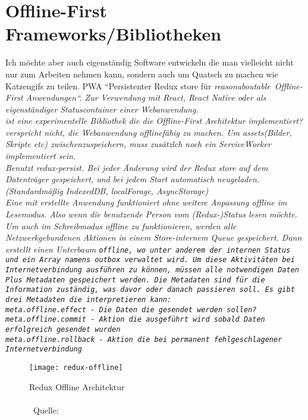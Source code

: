 \section{\label{sec:frameworks}Offline-First Frameworks/Bibliotheken}
  Ich möchte aber auch eigenständig Software entwickeln die man vielleicht nicht nur zum Arbeiten nehmen kann, sondern auch um Quatsch zu machen wie Katzengifs zu teilen.
  \Gls{PWA}
  \cite{realm}
  ``Persistenter Redux store für \it{reasonaboutable}\texttrademark ~Offline-First Anwendungen``. Zur Verwendung mit React, React Native oder als eigenständiger Statuscontainer einer Webanwendung.\\
  ist eine experimentelle Bibliothek die die Offline-First Architektur implementiert?\\
   verspricht nicht, die Webanwendung offlinefähig zu machen. Um \it{assets}(Bilder, Skripte etc) zwischenzuspeichern, muss zusätzlch noch ein ServiceWorker implementiert sein.\\
  Benutzt redux-persist. Bei jeder Änderung wird der Redux store auf dem Datenträger gespeichert, und bei jedem Start automatisch neugeladen. (Standardmäßig IndexedDB, localForage, AsyncStorage)\\
  Eine mit  erstellte Anwendung funktioniert ohne weitere Anpassung offline im Lesemodus. Also wenn die benutzende Person vom (Redux-)Status lesen möchte.
  Um auch im Schreibmodus offline zu funktionieren, werden alle Netzwerkgebundenen Aktionen in einem Store-internem \gls{Queue} gespeichert. Dann erstellt  einen Unterbaum \tt{offline}, wo unter anderem der internen Status und ein Array namens \tt{outbox} verwaltet wird. Um diese Aktivitäten bei Internetverbindung ausführen zu können, müssen alle notwendigen Daten Plus Metadaten gespeichert werden. Die Metadaten sind für die Information zuständig, was davor oder danach passieren soll. Es gibt drei Metadaten die  interpretieren kann:\\
  \tt{meta.offline.effect} - Die Daten die gesendet werden sollen?\\
  \tt{meta.offline.commit} - Aktion die ausgeführt wird sobald Daten erfolgreich gesendet wurden\\
  \tt{meta.offline.rollback} - Aktion die bei permanent fehlgeschlagener Internetverbindung
  ~\cite{redux-offline-gh}
  \begin{figure}[H]
    \centering
    \texttt{[image: redux-offline]}
    \grayRule
    \caption[Redux Offline]{Redux Offline Architektur\\\\~Quelle:~\cite{redux-offline}}
     \label{fig:redux-offline}
\end{figure}

